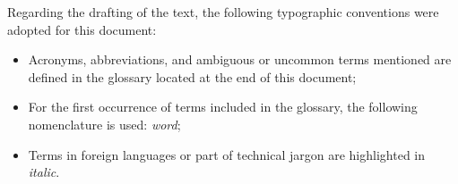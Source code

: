 Regarding the drafting of the text, the following typographic conventions were adopted for this document:
\begin{itemize}
	\item Acronyms, abbreviations, and ambiguous or uncommon terms mentioned are defined in the glossary located at the end of this document;
    \item For the first occurrence of terms included in the glossary, the following nomenclature is used: \emph{word}\glsfirst{};
	\item Terms in foreign languages or part of technical jargon are highlighted in \emph{italic}.
\end{itemize}
